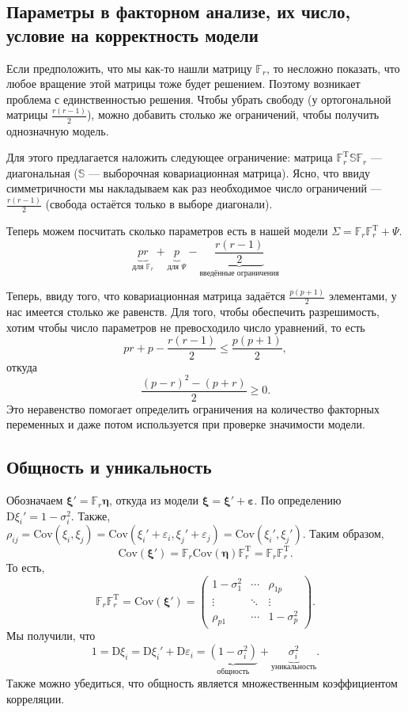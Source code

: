 \documentclass[12pt,a4paper,final]{article}
\newcommand{\1}{\mathds{1}}
\begin{document}
\subsection{Параметры в факторном анализе, их число, условие на корректность модели}

Если предположить, что мы как-то нашли матрицу $\mathbb F_r$, то несложно показать, что любое вращение этой матрицы тоже будет решением. Поэтому возникает проблема с единственностью решения. Чтобы убрать свободу (у ортогональной матрицы $\frac{r(r-1)}{2}$), можно добавить столько же ограничений, чтобы получить однозначную модель. 

Для этого предлагается наложить следующее ограничение: матрица $\mathbb{F}^\mathrm{T}_r \mathbb{S} \mathbb{F}_r$ --- диагональная ($\mathbb S$ --- выборочная ковариационная матрица). Ясно, что ввиду симметричности мы накладываем как раз необходимое число ограничений --- $\frac{r(r-1)}{2}$ (свобода остаётся только в выборе диагонали).
 
Теперь можем посчитать сколько параметров есть в нашей модели
$
\Sigma = \mathbb{F}_r \mathbb{F}_r^\mathrm{T} + \Psi.
$
$$
\underbrace{pr}_{\text{для } \mathbb{F}_r} + \underbrace{p}_{\text{для } \Psi} - \underbrace{\frac{r(r-1)}{2}}_{\text{введённые ограничения}}
$$

Теперь, ввиду того, что ковариационная матрица задаётся $\frac{p(p+1)}{2}$ элементами, у нас имеется столько же равенств. Для того, чтобы обеспечить разрешимость, хотим чтобы число параметров не превосходило число уравнений, то есть
$$
pr + p - \frac{r(r-1)}{2} \leqslant \frac{p(p+1)}{2},
$$
откуда
$$
\frac{(p-r)^2-(p+r)}{2} \geqslant 0.
$$
Это неравенство помогает определить ограничения на количество факторных переменных и даже потом используется при проверке значимости модели.

\subsection{Общность и уникальность}

Обозначаем $\bm \xi' = \mathbb{F}_r \bm \eta$, откуда из модели $\bm \xi = \bm \xi' + \bm \varepsilon$. 
По определению $\mathrm{D} \xi_i' = 1 - \sigma^2_i$. Также, $\rho_{ij} =\mathrm{Cov}(\xi_i, \xi_j) = \mathrm{Cov}(\xi_i' + \varepsilon_i, \xi_j' + \varepsilon_j) = \mathrm{Cov}(\xi_i', \xi_j')$. Таким образом, $$\mathrm{Cov}(\bm \xi') = \mathbb{F}_r \mathrm{Cov}(\bm \eta) \mathbb{F}_r^\mathrm{T} = \mathbb{F}_r \mathbb{F}_r^\mathrm{T}.$$ То есть,
$$
\mathbb{F}_r \mathbb{F}_r^\mathrm{T} = \mathrm{Cov}(\bm \xi') = 
\left( \begin{matrix}
1 - \sigma^2_1 & \cdots & \rho_{1p} \\
\vdots & \ddots & \vdots \\
\rho_{p1} & \cdots & 1 - \sigma^2_p
\end{matrix} \right).
$$
Мы получили, что 
$$
1 = \mathrm{D} \xi_i = \mathrm{D} \xi_i' + \mathrm{D} \varepsilon_i = \underbrace{(1 - \sigma^2_i)}_{\text{общность}} + \underbrace{\sigma^2_i}_{\text{уникальность}}.
$$
Также можно убедиться, что общность является множественным коэффициентом корреляции.
\end{document}
